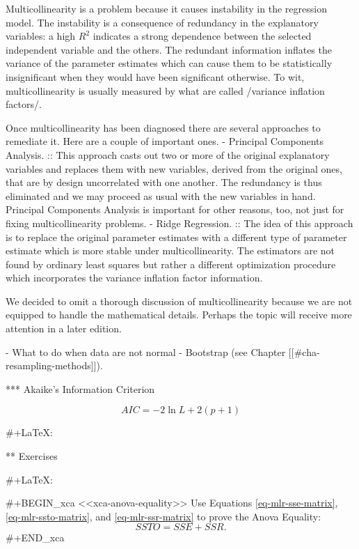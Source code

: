 Multicollinearity is a problem because it causes instability in the
regression model. The instability is a consequence of redundancy in
the explanatory variables: a high \(R^{2}\) indicates a strong
dependence between the selected independent variable and the
others. The redundant information inflates the variance of the
parameter estimates which can cause them to be statistically
insignificant when they would have been significant otherwise. To wit,
multicollinearity is usually measured by what are called /variance
inflation factors/.

Once multicollinearity has been diagnosed there are several approaches
to remediate it. Here are a couple of important ones.
- Principal Components Analysis. :: This approach casts out two or
     more of the original explanatory variables and replaces them with
     new variables, derived from the original ones, that are by design
     uncorrelated with one another. The redundancy is thus eliminated
     and we may proceed as usual with the new variables in
     hand. Principal Components Analysis is important for other
     reasons, too, not just for fixing multicollinearity problems.
- Ridge Regression. :: The idea of this approach is to replace the
     original parameter estimates with a different type of parameter
     estimate which is more stable under multicollinearity. The
     estimators are not found by ordinary least squares but rather a
     different optimization procedure which incorporates the variance
     inflation factor information.

We decided to omit a thorough discussion of multicollinearity because
we are not equipped to handle the mathematical details. Perhaps the
topic will receive more attention in a later edition.

- What to do when data are not normal
   - Bootstrap (see Chapter [[#cha-resampling-methods]]).

*** Akaike's Information Criterion

\[
AIC = -2\ln L + 2(p + 1)
\]

#+LaTeX: \newpage{}

** Exercises

#+LaTeX: \setcounter{thm}{0}

#+BEGIN_xca
<<xca-anova-equality>> Use Equations \eqref{eq-mlr-sse-matrix},
\eqref{eq-mlr-ssto-matrix}, and \eqref{eq-mlr-ssr-matrix} to prove the
Anova Equality: \[ SSTO = SSE + SSR.\]
#+END_xca
